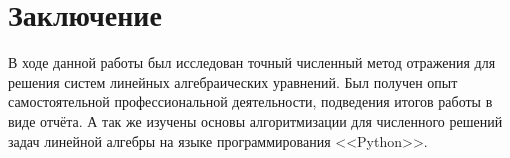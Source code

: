 \section{Заключение}
    В ходе данной работы был исследован точный численный метод отражения для решения систем линейных алгебраических уравнений. Был получен опыт самостоятельной профессиональной деятельности, подведения итогов работы в виде отчёта. А так же изучены основы алгоритмизации для численного решений задач линейной алгебры на языке программирования <<Python>>. 